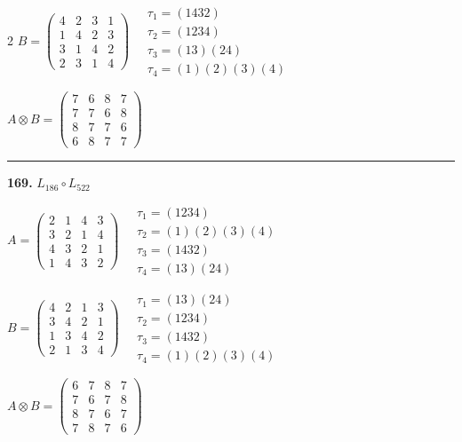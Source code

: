 \begin{multicols}{2}
$B = \begin{pmatrix} 4 & 2 & 3 & 1 \\ 1 & 4 & 2 & 3 \\ 3 & 1 & 4 & 2 \\ 2 & 3 & 1 & 4 \end{pmatrix} \quad \begin{matrix} \tau_{1}=(1 4 3 2) \\ \tau_{2}=(1 2 3 4) \\ \tau_{3}=(1 3)(2 4) \\ \tau_{4}=(1)(2)(3)(4) \end{matrix}$

$A \otimes B = \begin{pmatrix} 7 & 6 & 8 & 7 \\ 7 & 7 & 6 & 8 \\ 8 & 7 & 7 & 6 \\ 6 & 8 & 7 & 7 \end{pmatrix}$

\vspace{0.3em}
\hrule
\vspace{0.3em}

\noindent\textbf{169.} $L_{186} \circ L_{522}$

$A = \begin{pmatrix} 2 & 1 & 4 & 3 \\ 3 & 2 & 1 & 4 \\ 4 & 3 & 2 & 1 \\ 1 & 4 & 3 & 2 \end{pmatrix} \quad \begin{matrix} \tau_{1}=(1 2 3 4) \\ \tau_{2}=(1)(2)(3)(4) \\ \tau_{3}=(1 4 3 2) \\ \tau_{4}=(1 3)(2 4) \end{matrix}$

$B = \begin{pmatrix} 4 & 2 & 1 & 3 \\ 3 & 4 & 2 & 1 \\ 1 & 3 & 4 & 2 \\ 2 & 1 & 3 & 4 \end{pmatrix} \quad \begin{matrix} \tau_{1}=(1 3)(2 4) \\ \tau_{2}=(1 2 3 4) \\ \tau_{3}=(1 4 3 2) \\ \tau_{4}=(1)(2)(3)(4) \end{matrix}$

$A \otimes B = \begin{pmatrix} 6 & 7 & 8 & 7 \\ 7 & 6 & 7 & 8 \\ 8 & 7 & 6 & 7 \\ 7 & 8 & 7 & 6 \end{pmatrix}$


\end{multicols}
